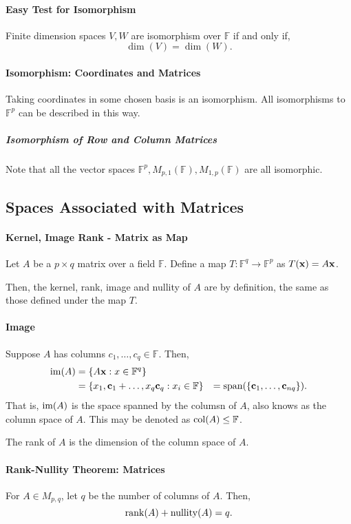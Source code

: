 \paragraph{Easy Test for Isomorphism}
Finite dimension spaces \(V, W\) are isomorphism over 
\(\mathbb{F}\) if and only if,
\[ \dim(V) = \dim(W).\]

\paragraph{Isomorphism: Coordinates and Matrices}
Taking coordinates in some chosen basis is an isomorphism.
All isomorphisms to \(\mathbb{F}^p\) can be described in this way.

\subparagraph{Isomorphism of Row and Column Matrices}
Note that all the vector spaces
\(\mathbb{F}^p, M_{p, 1}(\mathbb{F}), M_{1, p}(\mathbb{F})\)
are all isomorphic.

\subsection{Spaces Associated with Matrices}

\paragraph{Kernel, Image Rank - Matrix as Map}
Let \(A\) be a \(p\times q\) matrix over a field \(\mathbb{F}\).
Define a map \(T: \mathbb{F}^q \to \mathbb{F}^p\)
as \(T(\mathbf{x}) = A\mathbf{x}\).

Then, the kernel, rank, image and nullity of \(A\) are by definition, the same
as those defined under the map \(T\).

\paragraph{Image}
Suppose \(A\) has columns \(c_1, \dots, c_q \in \mathbb{F}\).
Then,
\begin{align*}
    \mathrm{im}(A) &= \{A \mathbf{x} : x \in \mathbb{F}^q\} \\
            &= \{x_1, \mathbf{c}_1 + \dots, x_q \mathbf{c}_q : x_i \in \mathbb{F}\}
            &= \mathrm{span}(\{\mathbf{c}_1, \dots, \mathbf{c}_{nq}\}).
\end{align*}
That is, \(\mathrm{im}(A)\) is the space spanned by the columsn of \(A\), also
knows as the column space of \(A\).
This may be denoted as \(\mathrm{col}(A) \leq \mathbb{F}\).

The rank of \(A\) is the dimension of the column space of \(A\).

\paragraph{Rank-Nullity Theorem: Matrices}
For \(A\in M_{p, q} \), let \(q\) be the number of columns of \(A\).
Then, \[
    \rank(A) + \mathrm{nullity}(A) = q
.\]

